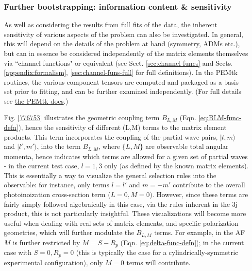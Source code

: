 \documentclass[10pt]{article}
\begin{document}
\subsubsection{Further bootstrapping: information content \& sensitivity\label{sec:bootstrapping-info-sensitivity}}

As well as considering the results from full fits of the data, the inherent sensitivity of various aspects of the problem can also be investigated. In general, this will depend on the details of the problem at hand (symmetry, ADMs etc.), but can in essence be considered independently of the matrix elements themselves via ``channel functions" or equivalent (see Sect. \ref{sec:channel-funcs} and Sects. \ref{appendix:formalism}, \ref{sec:channel-funs-full} for full definitions). In the PEMtk routines, the various component tensors are computed and packaged as a basis set prior to fitting, and can be further examined independently. (For full details see \href{https://pemtk.readthedocs.io/en/latest/fitting/PEMtk_fitting_basis-set_demo_050621-full.html}{the PEMtk docs}.)

Fig. \ref{776753} illustrates the geometric coupling term $B_{L,M}$ (Eqn. \ref{eq:BLM-func-defn}), hence the sensitivity of different (L,M) terms to the matrix element products. This term incorporates the coupling of the partial wave pairs, $|l,m\rangle$ and $|l',m'\rangle$, into the term $B_{L,M}$, where $\{L,M\}$ are observable total angular momenta, 
hence indicates which terms are allowed for a given set of partial waves - in the current test case, $l=1,3$ only (as defined by the known matrix elements). This is essentially a way to visualize the general selection rules into the observable: for instance, only terms $l=l'$ and $m=-m'$ contribute to the overall photoinoization cross-section term ($L=0, M=0$). However, since these terms are fairly simply followed algebraically in this case, via the rules inherent in the 3j product, this is not particularly insightful. These visualizations will become more useful when dealing with real sets of matrix elements, and specific polarization geometries, which will further modulate the $B_{L,M}$ terms. For example, in the AF $M$ is further restricted by $M = S-R_{p}$ (Eqn. \ref{eq:delta-func-defn}); in the current case with $S=0, R_p=0$ (this is typically the case for a cylindrically-symmetric experimental configuration), only $M=0$ terms will contribute.
\end{document}
